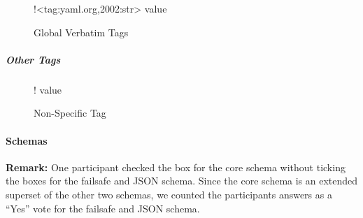 \begin{figure}[H]
  \begin{minipage}[t]{0.48\textwidth}
    \vspace{0pt}
    \begin{bchart}[max=9, width=0.85\textwidth]
    \end{bchart}
  \end{minipage}
  \begin{minipage}[t]{0.48\textwidth}
    \vspace{0pt}
    \begin{yamlcode}
      !<tag:yaml.org,2002:str> value
    \end{yamlcode}
  \end{minipage}
  \caption{Global Verbatim Tags}
\end{figure}

\subparagraph{Other Tags}

\begin{figure}[H]
  \begin{minipage}[t]{0.48\textwidth}
    \vspace{0pt}
    \begin{bchart}[max=9, width=0.85\textwidth]
    \end{bchart}
  \end{minipage}
  \begin{minipage}[t]{0.48\textwidth}
    \vspace{0pt}
    \begin{yamlcode}
      ! value
    \end{yamlcode}
  \end{minipage}
  \caption{Non-Specific Tag}
\end{figure}

\paragraph{Schemas}

\textbf{Remark:} One participant checked the box for the core schema without ticking the boxes for the failsafe and \gls{JSON} schema. Since the core schema is an extended superset of the other two schemas, we counted the participants answers as a “Yes” vote for the failsafe and \gls{JSON} schema.

